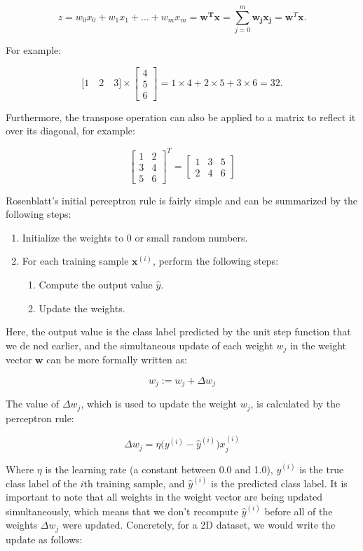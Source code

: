 \documentclass[letterpaper]{report}
\begin{document}
\[
z  = w_0 x_0 + w_1 x_1 + \dots + w_m x_m = \mathbf{w^T x} = \sum_{j=0}^{m} \mathbf{w_j} \mathbf{x_j} = \mathbf{w}^T \mathbf{x}.
\]

For example:

\[
\big[1 \quad 2 \quad 3 \big] \times \begin{bmatrix}
    4  \\
    5  \\
    6
\end{bmatrix} = 1 \times 4 + 2 \times 5 + 3 \times 6 = 32.
\]

Furthermore, the transpose operation can also be applied to a matrix to
reflect it over its diagonal, for example:

\[
 \begin{bmatrix}
    1 & 2  \\
    3 & 4  \\
    5 & 6
\end{bmatrix}^T =  \begin{bmatrix}
    1 & 3 & 5 \\
    2 & 4 & 6
\end{bmatrix}
\]

Rosenblatt's initial perceptron rule is fairly simple and can be summarized by the following steps:

\begin{enumerate}  
\item Initialize the weights to 0 or small random numbers.
\item For each training sample $\mathbf{x}^{(i)}$, perform the following steps:
\begin{enumerate}  
\item Compute the output value $\hat{y}$.
\item Update the weights.
\end{enumerate}
\end{enumerate}

Here, the output value is the class label predicted by the unit step function that we de ned earlier, and the simultaneous update of each weight $w_j$ in the weight vector $\mathbf{w}$ can be more formally written as:

\[
w_j := w_j + \Delta w_j
\]

The value of $\Delta w_j$, which is used to update the weight $w_j$, is calculated by the perceptron rule:

\[
\Delta w_j = \eta \bigg( y^{(i)} - \hat{y}^{(i)} \bigg)x_{j}^{(i)}
\]

Where $\eta$ is the learning rate (a constant between 0.0 and 1.0), $y^{(i)}$ is the true class label of the $i$th training sample, and $\hat{y}^{(i)}$ is the predicted class label. It is important to note that all weights in the weight vector are being updated simultaneously, which means that we don't recompute $\hat{y}^{(i)}$ before all of the weights $\Delta w_j$ were updated. Concretely, for a 2D dataset, we would write the update as follows:
\end{document}
